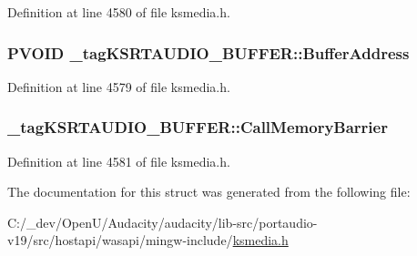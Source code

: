 Definition at line 4580 of file ksmedia.\+h.

\subsubsection[{\texorpdfstring{Buffer\+Address}{BufferAddress}}]{\setlength{\rightskip}{0pt plus 5cm}P\+V\+O\+ID \+\_\+tag\+K\+S\+R\+T\+A\+U\+D\+I\+O\+\_\+\+B\+U\+F\+F\+E\+R\+::\+Buffer\+Address}\hypertarget{struct__tag_k_s_r_t_a_u_d_i_o___b_u_f_f_e_r_aa5e3cc1a7269df0a451e6d087991098c}{}\label{struct__tag_k_s_r_t_a_u_d_i_o___b_u_f_f_e_r_aa5e3cc1a7269df0a451e6d087991098c}


Definition at line 4579 of file ksmedia.\+h.

\subsubsection[{\texorpdfstring{Call\+Memory\+Barrier}{CallMemoryBarrier}}]{ \+\_\+tag\+K\+S\+R\+T\+A\+U\+D\+I\+O\+\_\+\+B\+U\+F\+F\+E\+R\+::\+Call\+Memory\+Barrier}\hypertarget{struct__tag_k_s_r_t_a_u_d_i_o___b_u_f_f_e_r_a4594c680b1a921fe13e37bf2d278f703}{}\label{struct__tag_k_s_r_t_a_u_d_i_o___b_u_f_f_e_r_a4594c680b1a921fe13e37bf2d278f703}


Definition at line 4581 of file ksmedia.\+h.



The documentation for this struct was generated from the following file\+:\begin{DoxyCompactItemize}
\item 
C\+:/\+\_\+dev/\+Open\+U/\+Audacity/audacity/lib-\/src/portaudio-\/v19/src/hostapi/wasapi/mingw-\/include/\hyperlink{ksmedia_8h}{ksmedia.\+h}\end{DoxyCompactItemize}
